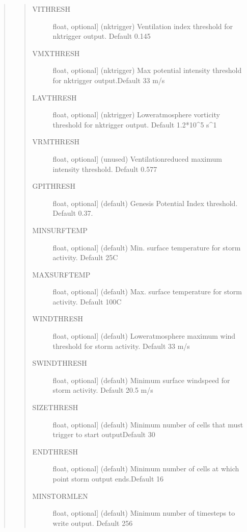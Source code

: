 \documentclass[letterpaper,10pt,english]{sphinxmanual}
\begin{document}
\begin{fulllineitems}
\begin{fulllineitems}
\begin{quote}
\begin{quote}
\begin{description}
\begin{description}
\begin{description}
\item[{VITHRESH}] \leavevmode{[}float, optional{]}
(nktrigger) Ventilation index threshold for nktrigger output. Default 0.145

\item[{VMXTHRESH}] \leavevmode{[}float, optional{]}
(nktrigger) Max potential intensity threshold for nktrigger output.Default 33 m/s

\item[{LAVTHRESH}] \leavevmode{[}float, optional{]}
(nktrigger) Lower\sphinxhyphen{}atmosphere vorticity threshold for nktrigger output. Default 1.2*10\textasciicircum{}\sphinxhyphen{}5 s\textasciicircum{}\sphinxhyphen{}1

\item[{VRMTHRESH}] \leavevmode{[}float, optional{]}
(unused) Ventilation\sphinxhyphen{}reduced maximum intensity threshold. Default 0.577

\item[{GPITHRESH}] \leavevmode{[}float, optional{]}
(default) Genesis Potential Index threshold. Default 0.37.

\item[{MINSURFTEMP}] \leavevmode{[}float, optional{]}
(default) Min. surface temperature for storm activity. Default 25C

\item[{MAXSURFTEMP}] \leavevmode{[}float, optional{]}
(default) Max. surface temperature for storm activity. Default 100C

\item[{WINDTHRESH}] \leavevmode{[}float, optional{]}
(default) Lower\sphinxhyphen{}atmosphere maximum wind threshold for storm activity.  Default 33 m/s

\item[{SWINDTHRESH}] \leavevmode{[}float, optional{]}
(default) Minimum surface windspeed for storm activity. Default 20.5 m/s

\item[{SIZETHRESH}] \leavevmode{[}float, optional{]}
(default) Minimum number of cells that must trigger to start outputDefault 30

\item[{ENDTHRESH}] \leavevmode{[}float, optional{]}
(default) Minimum number of cells at which point storm output ends.Default 16

\item[{MINSTORMLEN}] \leavevmode{[}float, optional{]}
(default) Minimum number of timesteps to write output. Default 256


\end{description}
\end{description}
\end{description}
\end{quote}
\end{quote}
\end{fulllineitems}
\end{fulllineitems}
\end{document}
